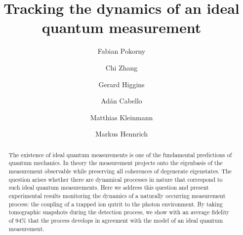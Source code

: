 \documentclass[
aps,prl,
reprint,
a4paper,
superscriptaddress,
floatfix,
]{revtex4-1}
\begin{document}

\iftrue
\title{Tracking the dynamics of an ideal quantum measurement}
\else
\title{Tracking the dynamics of an ideal quantum measurement in a trapped-ion 
 fluorescence experiment}
\fi

\author{Fabian Pokorny}

\author{Chi Zhang}

\author{Gerard Higgins}

\author{Adán Cabello}

\author{Matthias Kleinmann}

\author{Markus Hennrich}

\begin{abstract}
The existence of ideal quantum measurements is one of the fundamental predictions of quantum mechanics.
In theory the measurement projects onto the eigenbasis of the measurement observable while preserving all coherences of degenerate eigenstates.
The question arises whether there are dynamical processes in nature that correspond to such ideal quantum measurements.
Here we address this question and present experimental results monitoring the dynamics of a naturally occurring measurement process: the coupling of a trapped ion qutrit to the photon environment.
By taking tomographic snapshots during the detection process, we show with an average fidelity of $94\%$ that the process develops in agreement with the model of an ideal quantum measurement.
\end{abstract}
\end{document}
